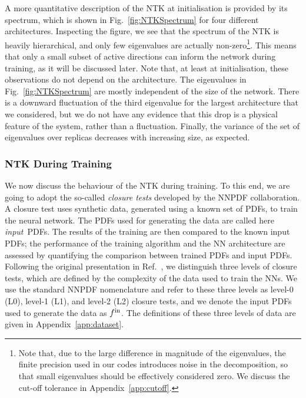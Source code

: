 A more quantitative description of the NTK at initialisation is provided by its
spectrum, which is shown in Fig.~\ref{fig:NTKSpectrum} for four different
architectures. Inspecting the figure, we see that the spectrum of the NTK is
heavily hierarchical, and only few eigenvalues are actually
non-zero\footnote{Note that, due to the large difference in magnitude of the
eigenvalues, the finite precision used in our codes introduces noise in the
decomposition, so that small eigenvalues should be effectively considered zero.
We discuss the cut-off tolerance in Appendix~\ref{app:cutoff}.}. This means that
only a small subset of active directions can inform the network during training,
as it will be discussed later. Note that, at least at initialisation, these
observations do not depend on the architecture. The eigenvalues in
Fig.~\ref{fig:NTKSpectrum} are mostly independent of the size of the network.
There is a downward fluctuation of the third eigenvalue for the largest
architecture that we considered, but we do not have any evidence that this drop
is a physical feature of the system, rather than a fluctuation. Finally, the
variance of the set of eigenvalues over replicas decreases with increasing size,
as expected. 


\subsubsection{NTK During Training}
\label{sec:NTKDuringTraining}

We now discuss the behaviour of the NTK during training. To this end, we are
going to adopt the so-called {\em closure tests} developed by the NNPDF
collaboration. A closure test uses synthetic data, generated using a known set
of PDFs, to train the neural network. The PDFs used for generating the data are
called here {\em input}\ PDFs. The results of the training are then compared to
the known input PDFs; the performance of the training algorithm and the NN
architecture are assessed by quantifying the comparison between trained PDFs and
input PDFs. Following the original presentation in Ref.~\cite{NNPDF:2014otw}, we
distinguish three levels of closure tests, which are defined by the complexity
of the data used to train the NNs. We use the standard NNPDF nomenclature and
refer to these three levels as level-0 (L0), level-1 (L1), and level-2 (L2)
closure tests, and we denote the input PDFs used to generate the data as $f^{\rm in}$.
The definitions of these three levels of data are given in Appendix~\ref{app:dataset}.

